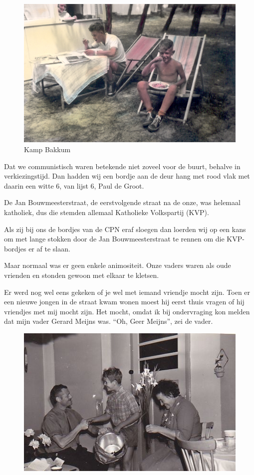 \documentclass[10pt,twoside, openright]{memoir}
\begin{document}
\begin{figure}
\includegraphics[width=\textwidth]{img/ch5/Bakkum2}
\caption*{\footnotesize Kamp Bakkum}
\end{figure} 

Dat we communistisch waren betekende niet zoveel voor de buurt, behalve in verkiezingstijd. Dan hadden wij een bordje aan de deur hang met rood vlak met daarin een witte 6, van lijst 6, Paul de Groot. 


De Jan Bouwmeesterstraat, de eerstvolgende straat na de onze, was helemaal katholiek, dus die stemden allemaal Katholieke Volkspartij (KVP). 

Als zij bij ons de bordjes van de CPN eraf sloegen dan loerden wij op een kans om met lange stokken door de Jan Bouwmeesterstraat te rennen om die KVP-bordjes er af te slaan.

Maar normaal was er geen enkele animositeit. Onze vaders waren als oude vrienden en stonden gewoon met elkaar te kletsen. 

Er werd nog wel eens gekeken of je wel met iemand vriendje mocht zijn. Toen er een nieuwe jongen in de straat kwam wonen moest hij eerst thuis vragen of hij vriendjes met mij mocht zijn. Het mocht, omdat ik bij ondervraging kon melden dat mijn vader Gerard Meijns was. ``Oh, Geer Meijns'', zei de vader. 

\begin{figure}
\includegraphics[width=\textwidth]{img/ch5/vanharte}
\caption*{\footnotesize }
\end{figure} 
\end{document}
